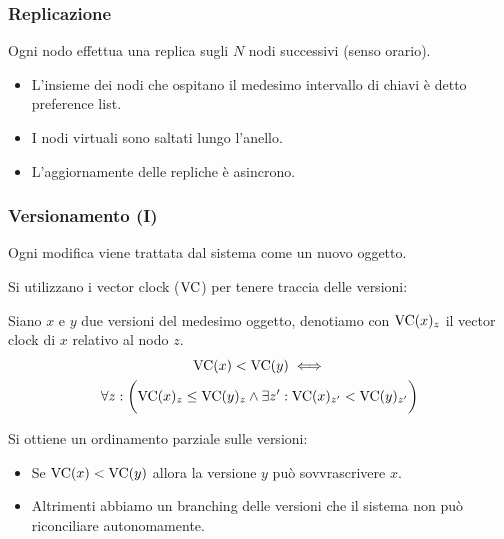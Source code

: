 \begin{frame}
  \frametitle{Replicazione}
  Ogni nodo effettua una replica sugli $N$ nodi successivi (senso orario).
  \begin{itemize}
  \item L'insieme dei nodi che ospitano il medesimo intervallo di chiavi è detto \alert{preference list}.
  \item I nodi virtuali sono saltati lungo l'anello.
  \item L'aggiornamente delle repliche è \alert{asincrono}.
  \end{itemize}
\end{frame}


\begin{frame}
  \frametitle{Versionamento (I)}
  Ogni modifica viene trattata dal sistema come un nuovo oggetto.
  
  Si utilizzano i \alert{vector clock} ($\mathrm{VC}$) per tenere traccia delle versioni:

  \begin{definizione}
    Siano $x$ e $y$ due versioni del medesimo oggetto, denotiamo con $\mathrm{VC}(x)_z$ il vector clock di $x$ relativo al nodo $z$.
    \begin{multline*}
    \mathrm{VC}(x) < \mathrm{VC}(y) \iff \\
      \forall z \mathrel{:} \bigg( \mathrm{VC}(x)_z \leq \mathrm{VC}(y)_z \land \exists z' \mathrel{:} \mathrm{VC}(x)_{z'} < \mathrm{VC}(y)_{z'} \bigg) 
    \end{multline*}
  \end{definizione}

  Si ottiene un ordinamento parziale sulle versioni:
  \begin{itemize}
  \item Se $\mathrm{VC}(x) < \mathrm{VC}(y)$ allora la versione $y$ può sovvrascrivere $x$.
  \item Altrimenti abbiamo un branching delle versioni che il sistema non può riconciliare autonomamente.
  \end{itemize}

\end{frame}


